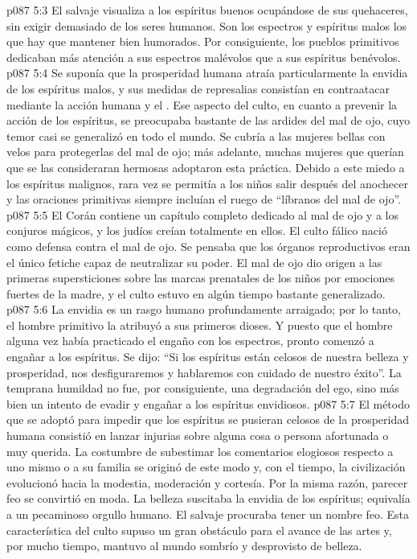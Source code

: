 \vs p087 5:3 El salvaje visualiza a los espíritus buenos ocupándose de sus quehaceres, sin exigir demasiado de los seres humanos. Son los espectros y espíritus malos los que hay que mantener bien humorados. Por consiguiente, los pueblos primitivos dedicaban más atención a sus espectros malévolos que a sus espíritus benévolos.
\vs p087 5:4 Se suponía que la prosperidad humana atraía particularmente la envidia de los espíritus malos, y sus medidas de represalias consistían en contraatacar mediante la acción humana y el . Ese aspecto del culto, en cuanto a prevenir la acción de los espíritus, se preocupaba bastante de las ardides del mal de ojo, cuyo temor casi se generalizó en todo el mundo. Se cubría a las mujeres bellas con velos para protegerlas del mal de ojo; más adelante, muchas mujeres que querían que se las consideraran hermosas adoptaron esta práctica. Debido a este miedo a los espíritus malignos, rara vez se permitía a los niños salir después del anochecer y las oraciones primitivas siempre incluían el ruego de “líbranos del mal de ojo”.
\vs p087 5:5 El Corán contiene un capítulo completo dedicado al mal de ojo y a los conjuros mágicos, y los judíos creían totalmente en ellos. El culto fálico nació como defensa contra el mal de ojo. Se pensaba que los órganos reproductivos eran el único fetiche capaz de neutralizar su poder. El mal de ojo dio origen a las primeras supersticiones sobre las marcas prenatales de los niños por emociones fuertes de la madre, y el culto estuvo en algún tiempo bastante generalizado.
\vs p087 5:6 La envidia es un rasgo humano profundamente arraigado; por lo tanto, el hombre primitivo la atribuyó a sus primeros dioses. Y puesto que el hombre alguna vez había practicado el engaño con los espectros, pronto comenzó a engañar a los espíritus. Se dijo: “Si los espíritus están celosos de nuestra belleza y prosperidad, nos desfiguraremos y hablaremos con cuidado de nuestro éxito”. La temprana humildad no fue, por consiguiente, una degradación del ego, sino más bien un intento de evadir y engañar a los espíritus envidiosos.
\vs p087 5:7 El método que se adoptó para impedir que los espíritus se pusieran celosos de la prosperidad humana consistió en lanzar injurias sobre alguna cosa o persona afortunada o muy querida. La costumbre de subestimar los comentarios elogiosos respecto a uno mismo o a su familia se originó de este modo y, con el tiempo, la civilización evolucionó hacia la modestia, moderación y cortesía. Por la misma razón, parecer feo se convirtió en moda. La belleza suscitaba la envidia de los espíritus; equivalía a un pecaminoso orgullo humano. El salvaje procuraba tener un nombre feo. Esta característica del culto supuso un gran obstáculo para el avance de las artes y, por mucho tiempo, mantuvo al mundo sombrío y desprovisto de belleza.
